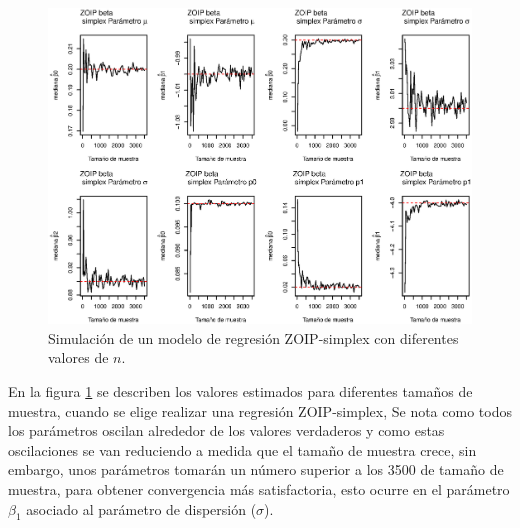 \begin{figure}
	\begin{center}
		\includegraphics[scale=0.5]{Converg_Simplex.eps}	
		\caption{Simulaci\'{o}n de un modelo de regresi\'{o}n ZOIP-simplex con diferentes valores de $n$.}
		\label{Simu_simplex}
	\end{center}
\end{figure}

En la figura \ref{Simu_simplex} se describen los valores estimados para diferentes tama\~{n}os de muestra, cuando se elige realizar una regresi\'{o}n ZOIP-simplex, Se nota como todos los par\'{a}metros oscilan alrededor de los valores verdaderos y como estas oscilaciones se van reduciendo a medida que el tama\~{n}o de muestra crece, sin embargo, unos par\'{a}metros tomar\'{a}n un n\'{u}mero superior a los 3500 de tama\~{n}o de muestra, para obtener convergencia m\'{a}s satisfactoria, esto ocurre en el par\'{a}metro $\beta_1$ asociado al par\'{a}metro de dispersi\'{o}n ($\sigma$).\\


